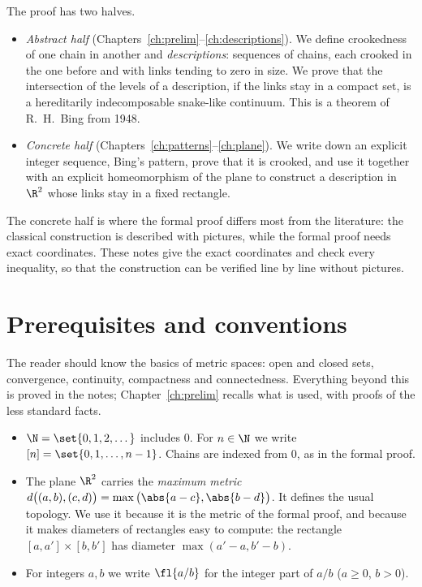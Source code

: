 The proof has two halves.
\begin{itemize}
\item \emph{Abstract half} (Chapters~\ref{ch:prelim}--\ref{ch:descriptions}). We define
crookedness of one chain in another and \emph{descriptions}: sequences of chains, each
crooked in the one before and with links tending to zero in size. We prove that the
intersection of the levels of a description, if the links stay in a compact set, is a
hereditarily indecomposable snake-like continuum. This is a theorem of R.~H.~Bing from
1948.
\item \emph{Concrete half} (Chapters~\ref{ch:patterns}--\ref{ch:plane}). We write down an
explicit integer sequence, Bing's pattern, prove that it is crooked, and use it together
with an explicit homeomorphism of the plane to construct a description in $\R^2$ whose
links stay in a fixed rectangle.
\end{itemize}

The concrete half is where the formal proof differs most from the literature: the
classical construction is described with pictures, while the formal proof needs exact
coordinates. These notes give the exact coordinates and check every inequality, so that
the construction can be verified line by line without pictures.

\section{Prerequisites and conventions}

The reader should know the basics of metric spaces: open and closed sets, convergence,
continuity, compactness and connectedness. Everything beyond this is proved in the notes;
Chapter~\ref{ch:prelim} recalls what is used, with proofs of the less standard facts.

\begin{itemize}
\item $\N=\set{0,1,2,\dots}$ includes $0$. For $n\in\N$ we write $[n]=\set{0,1,\dots,n-1}$.
Chains are indexed from $0$, as in the formal proof.
\item The plane $\R^2$ carries the \emph{maximum metric}
$d\big((a,b),(c,d)\big)=\max\big(\abs{a-c},\abs{b-d}\big)$. It defines the usual topology.
We use it because it is the metric of the formal proof, and because it makes diameters of
rectangles easy to compute: the rectangle $[a,a']\times[b,b']$ has diameter
$\max(a'-a,b'-b)$.
\item For integers $a,b$ we write $\fl{a/b}$ for the integer part of $a/b$ ($a\ge0$, $b>0$).
\end{itemize}

